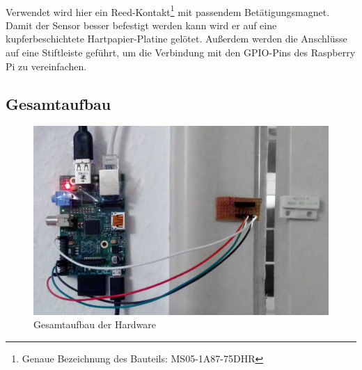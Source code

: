 \\Verwendet wird hier ein Reed-Kontakt\footnote{Genaue Bezeichnung des Bauteils: MS05-1A87-75DHR} mit passendem Bet\"atigungsmagnet.
Damit der Sensor besser befestigt werden kann wird er auf eine kupferbeschichtete Hartpapier-Platine gel\"otet. Au{\ss}erdem werden die Anschl\"usse auf eine Stiftleiste gef\"uhrt, um die Verbindung mit den GPIO-Pins des Raspberry Pi zu vereinfachen.\\

\subsection{Gesamtaufbau}
\begin{figure}[ht]
    \centering
    \includegraphics[scale=0.15]{images/aufbauklein}
    \caption{Gesamtaufbau der Hardware}
    \label{fig:gesamt}
\end{figure}

\newpage

